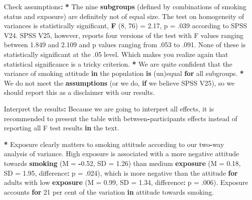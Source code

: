 \documentclass[a4paper]{book}
\newenvironment{Shaded}{\begin{snugshade}}{\end{snugshade}}
\newcommand{\KeywordTok}[1]{\textcolor[rgb]{0,0,0}{\textbf{#1}}}
\newcommand{\DataTypeTok}[1]{\textcolor[rgb]{0,0,0}{#1}}
\newcommand{\DecValTok}[1]{\textcolor[rgb]{0.00,0.00,0.00}{#1}}
\newcommand{\FloatTok}[1]{\textcolor[rgb]{0.00,0.00,0.00}{#1}}
\newcommand{\StringTok}[1]{\textcolor[rgb]{0.00,0.00,0.00}{#1}}
\newcommand{\ControlFlowTok}[1]{\textcolor[rgb]{0.00,0.00,0.00}{\textbf{#1}}}
\newcommand{\OperatorTok}[1]{\textcolor[rgb]{0.00,0.00,0.00}{\textbf{#1}}}
\newcommand{\ErrorTok}[1]{\textcolor[rgb]{0.00,0.00,0.00}{\textbf{#1}}}
\newcommand{\NormalTok}[1]{#1}
\theoremstyle{definition}
\theoremstyle{definition}
\theoremstyle{definition}
\theoremstyle{remark}
\begin{document}
\begin{Shaded}
\begin{Highlighting}[]
\NormalTok{Check assumptions}\OperatorTok{:}\StringTok{  }
\StringTok{  }
\ErrorTok{*}\StringTok{ }\NormalTok{The nine }\KeywordTok{subgroups}\NormalTok{ (defined by combinations of smoking status and exposure)}
\NormalTok{are definitely not of equal size. The test on homogeneity of variances is}
\NormalTok{statistically significant, }\KeywordTok{F}\NormalTok{ (}\DecValTok{8}\NormalTok{, }\DecValTok{76}\NormalTok{) =}\StringTok{ }\FloatTok{2.17}\NormalTok{, p =}\StringTok{ }\NormalTok{.}\DecValTok{039}\NormalTok{ according to SPSS V24.}
\NormalTok{SPSS V25, however, reports four versions of the test with F values ranging}
\NormalTok{between }\FloatTok{1.849}\NormalTok{ and }\FloatTok{2.109}\NormalTok{ and p values ranging from .}\DecValTok{053}\NormalTok{ to .}\DecValTok{091}\NormalTok{. None of these}
\NormalTok{is statistically significant at the .}\DecValTok{05}\NormalTok{ level. Which makes you realize again}
\NormalTok{that statistical significance is a tricky criterion.}
\OperatorTok{*}\StringTok{ }\NormalTok{We are quite confident that the variance of smoking attitude }\ControlFlowTok{in}\NormalTok{ the}
\NormalTok{population }\KeywordTok{is}\NormalTok{ (un)equal }\ControlFlowTok{for}\NormalTok{ all subgroups.  }
\OperatorTok{*}\StringTok{ }\NormalTok{We do not meet the }\KeywordTok{assumptions}\NormalTok{ (or we do, }\ControlFlowTok{if}\NormalTok{ we believe SPSS V25), so we}
\NormalTok{should report this as a disclaimer with our results.}
  
\NormalTok{Interpret the results}\OperatorTok{:}\StringTok{  }
\StringTok{  }
\NormalTok{Because we are going to interpret all effects, it is recommended to present  }
\NormalTok{the table with between}\OperatorTok{-}\NormalTok{participants effects instead of reporting all F test  }
\NormalTok{results }\ControlFlowTok{in}\NormalTok{ the text.  }
    
\OperatorTok{*}\StringTok{ }\NormalTok{Exposure clearly matters to smoking attitude according to our two}\OperatorTok{-}\NormalTok{way  }
\NormalTok{analysis of variance. High exposure is associated with a more negative  }
\NormalTok{attitude towards }\KeywordTok{smoking}\NormalTok{ (}\DataTypeTok{M =} \OperatorTok{-}\FloatTok{0.52}\NormalTok{, }\DataTypeTok{SD =} \FloatTok{1.26}\NormalTok{) than medium }\KeywordTok{exposure}\NormalTok{ (}\DataTypeTok{M =}  
\FloatTok{0.18}\NormalTok{, }\DataTypeTok{SD =} \FloatTok{1.95}\NormalTok{, difference}\OperatorTok{:}\StringTok{ }\DataTypeTok{p =}\NormalTok{ .}\DecValTok{024}\NormalTok{), which is more negative than the  }
\NormalTok{attitude }\ControlFlowTok{for}\NormalTok{ adults with low }\KeywordTok{exposure}\NormalTok{ (}\DataTypeTok{M =} \FloatTok{0.99}\NormalTok{, }\DataTypeTok{SD =} \FloatTok{1.34}\NormalTok{, difference}\OperatorTok{:}\StringTok{ }\DataTypeTok{p =}  
\NormalTok{.}\DecValTok{006}\NormalTok{). Exposure accounts }\ControlFlowTok{for} \DecValTok{21}\NormalTok{ per cent of the variation }\ControlFlowTok{in}\NormalTok{ attitude towards  }
\NormalTok{smoking.  }
  

\end{Highlighting}
\end{Shaded}
\end{document}
